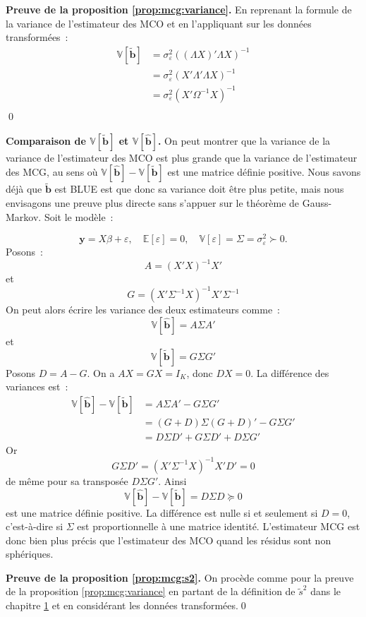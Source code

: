 \documentclass[10pt]{beamer}
\theoremstyle{plain}
\begin{document}
\begin{notes}

  \textbf{Preuve de la proposition \ref{prop:mcg:variance}.} En reprenant la formule de la variance de l'estimateur des MCO et en l'appliquant sur les données transformées~:
  \[
    \begin{split}
      \mathbb V \left[\tilde{\textbf{b}}\right] &= \sigma_{\varepsilon}^2\left((\Lambda X)'\Lambda X  \right)^{-1}\\
                                                &= \sigma_{\varepsilon}^2\left(X'\Lambda'\Lambda X  \right)^{-1}\\
                                                &= \sigma_{\varepsilon}^2\left(X'\Omega^{-1} X \right)^{-1}\\
    \end{split}
  \]
  \qed

  \bigskip

  \textbf{Comparaison de $\mathbb V [\tilde{\textbf{b}}]$
    et $\mathbb V [\hat{\textbf{b}}]$.} On peut montrer que la
  variance de la variance de l'estimateur des MCO est plus grande que
  la variance de l'estimateur des MCG, au sens
  où $\mathbb V [\hat{\textbf{b}}]-\mathbb V [\tilde{\textbf{b}}]$ est
  une matrice définie positive. Nous savons déjà
  que $\tilde{\textbf{b}}$ est BLUE est que donc sa variance doit être
  plus petite, mais nous envisagons une preuve plus directe sans
  s'appuer sur le théorème de Gauss-Markov. Soit le modèle~:

  \[
\mathbf y=X\beta+\varepsilon,\quad \mathbb E[\varepsilon]=0,\quad \mathbb V[\varepsilon]=\Sigma = \sigma_{\varepsilon}^2\succ 0.
\]
Posons~:
\[
  A = (X'X)^{-1}X'
\]
et
\[
  G = (X'\Sigma^{-1}X)^{-1}X'\Sigma^{-1}
\]
On peut alors écrire les variance des deux estimateurs comme~:
\[
\mathbb V[\hat{\textbf{b}}] = A\Sigma A'
\]
et
\[
\mathbb V[\tilde{\textbf{b}}] = G\Sigma G'
\]
Posons \(D=A-G\). On a \(AX=GX=I_K\), donc \(DX=0\). La différence des variances est~:
\[
  \begin{split}
    \mathbb V[\hat{\textbf{b}}]-\mathbb V[\tilde{\textbf{b}}] &= A\Sigma A' - G\Sigma G'\\
&= (G+D)\Sigma(G+D)' - G\Sigma G'\\
&= D\Sigma D' + G\Sigma D' + D\Sigma G'
  \end{split}
\]
Or
\[
G\Sigma D' = (X'\Sigma^{-1}X)^{-1}X'D' = 0
\]
de même pour sa transposée $D\Sigma G'$. Ainsi
\[
  \mathbb V[\hat{\textbf{b}}]-\mathbb V[\tilde{\textbf{b}}] = D\Sigma D \succeq 0
\]
est une matrice définie positive. La différence est nulle si et
seulement si $D=0$, c'est-à-dire si $\Sigma$ est proportionnelle à une
matrice identité. L'estimateur MCG est donc bien plus précis que
l'estimateur des MCO quand les résidus sont non sphériques.

\bigskip

\textbf{Preuve de la proposition \ref{prop:mcg:s2}.} On procède comme
pour la preuve de la proposition \ref{prop:mcg:variance} en partant de
la définition de $\tilde{s}^2$ dans le chapitre
\href{https://le-mans.adjemian.eu/econometrics/chapitre-1.pdf}{1} et
en considérant les données transformées.\qed

\end{notes}
\end{document}
